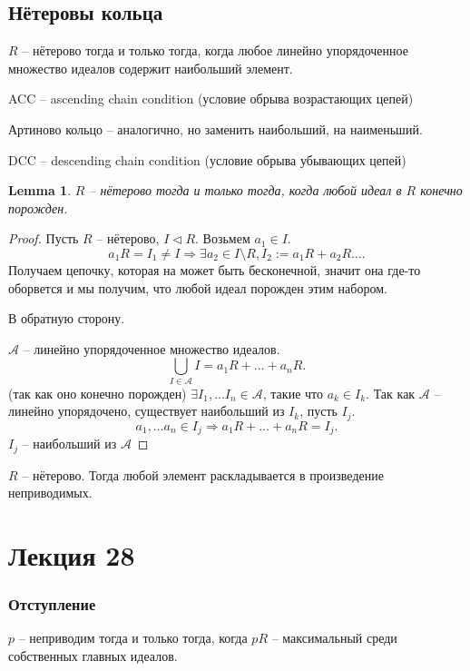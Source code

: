 \documentclass[11pt]{book}
\theoremstyle{definition}
\theoremstyle{plain}
\theoremstyle{plain}
\newtheorem*{lm}{Lemma}
\theoremstyle{definition}
\theoremstyle{remark}
\begin{document}
\subsection{Нётеровы кольца}
\begin{defn}
    $R$ -- нётерово тогда и только тогда, когда любое линейно упорядоченное множество идеалов содержит наибольший элемент.

ACC -- ascending chain condition (условие обрыва возрастающих цепей)
\end{defn}
\begin{defn}
Артиново кольцо -- аналогично, но заменить наибольший, на наименьший.

DCC -- descending chain condition (условие обрыва убывающих цепей)
\end{defn}
\begin{lm}
    $ R$ -- нётерово тогда и только тогда, когда любой идеал в $ R$ конечно порожден.
\end{lm}
\begin{proof}
    Пусть $ R$ -- нётерово, $ I \triangleleft R$. Возьмем $ a_1 \in  I$. \[
    a_1 R = I_1\ne I \Longrightarrow  \exists  a_2 \in  I \setminus R , I_2 := a_1R + a_2R \ldots  
    .\] 
    Получаем цепочку, которая на может быть бесконечной, значит она где-то оборвется и мы получим, что любой идеал порожден этим набором.
     
    В обратную сторону.

    $ \mathcal{A} $ -- линейно упорядоченное множество идеалов. 
    \[
	\bigcup_{I \in  \mathcal A} I = a_1 R + \ldots  +a_n R
    .\] (так как оно конечно порожден)
    $ \exists  I_1, \ldots I_n \in  \mathcal{A}$, такие что $ a_k \in  I_k$.
    Так как $ \mathcal{A}$ -- линейно упорядочено, существует наибольший из $ I_k$, пусть $ I_j$.
     \[
    a_1, \ldots a_n \in  I_j \Longrightarrow a_1R + \ldots + a_n R = I_j
    .\] 
$ I_j$ -- наибольший из $ \mathcal{A}$
\end{proof}
\begin{thm}
    $ R$ -- нётерово. Тогда любой элемент раскладывается в произведение неприводимых.
\end{thm}
\section{Лекция 28}
\subsubsection{Отступление}
$ p$ -- неприводим тогда и только тогда, когда $ pR$ -- максимальный среди собственных главных идеалов.
\end{document}
